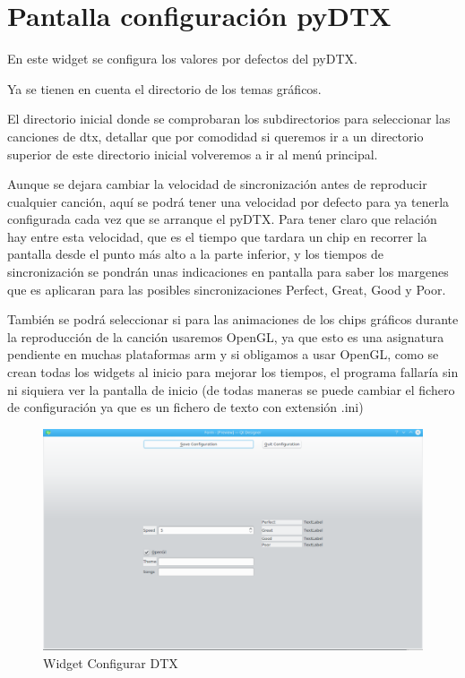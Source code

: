 \documentclass[a4paper,11pt,oneside]{book}
\begin{document}
\section{Pantalla configuración pyDTX}
En este widget se configura los valores por defectos del pyDTX.

Ya se tienen en cuenta el directorio de los temas gráficos.

El directorio inicial donde se comprobaran los subdirectorios para seleccionar las canciones de dtx, detallar que por comodidad si queremos ir a un directorio superior de este directorio inicial volveremos a ir al menú principal.

Aunque se dejara cambiar la velocidad de sincronización antes de reproducir cualquier canción, aquí se podrá tener una velocidad por defecto para ya tenerla configurada cada vez que se arranque el pyDTX. Para tener claro que relación hay entre esta velocidad, que es el tiempo que tardara un chip en recorrer la pantalla desde el punto más alto a la parte inferior, y los tiempos de sincronización se pondrán unas indicaciones en pantalla para saber los margenes que es aplicaran para las posibles sincronizaciones Perfect, Great, Good y Poor.

También se podrá seleccionar si para las animaciones de los chips gráficos durante la reproducción de la canción usaremos OpenGL, ya que esto es una asignatura pendiente en muchas plataformas arm y si obligamos a usar OpenGL, como se crean todas los widgets al inicio para mejorar los tiempos, el programa fallaría sin ni siquiera ver la pantalla de inicio (de todas maneras se puede cambiar el fichero de configuración ya que es un fichero de texto con extensión .ini)
 
\begin{figure}[H]
\begin{center}
\includegraphics[scale=0.4]{Imagenes/WidgetConfigurarDTX.png}
\caption{Widget Configurar DTX}
\label{Widget Configurar DTX}
\end{center}
\end{figure}
 
\end{document}
